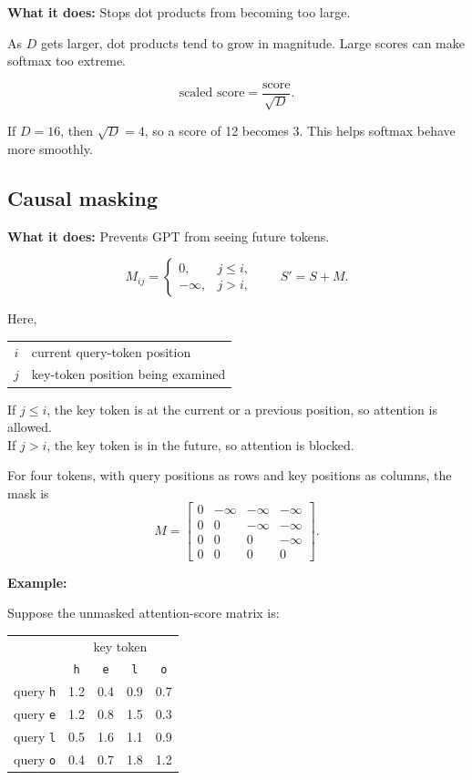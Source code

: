 \textbf{What it does:} Stops dot products from becoming too large.

As \(D\) gets larger, dot products tend to grow in magnitude. Large scores can
make softmax too extreme.

\[
  \text{scaled score}=\frac{\text{score}}{\sqrt{D}}.
\]

If \(D=16\), then \(\sqrt{D}=4\), so a score of 12 becomes 3. This helps
softmax behave more smoothly.

\subsection{Causal masking}

\textbf{What it does:} Prevents GPT from seeing future tokens.

\[
  M_{ij}=
  \begin{cases}
    0,       & j\leq i,\\
    -\infty, & j>i,
  \end{cases}
  \qquad
  S'=S+M.
\]

Here,
\begin{center}
\begin{tabular}{@{}cl@{}}
  \(i\) & current query-token position \\
  \(j\) & key-token position being examined
\end{tabular}
\end{center}

If \(j\leq i\), the key token is at the current or a previous position, so attention is allowed. \\
If \(j>i\), the key token is in the future, so attention
is blocked.

For four tokens, with query positions as rows and key positions as columns,
the mask is
\[
  M=
  \begin{bmatrix}
    0 & -\infty & -\infty & -\infty \\
    0 & 0       & -\infty & -\infty \\
    0 & 0       & 0       & -\infty \\
    0 & 0       & 0       & 0
  \end{bmatrix}.
\]

\textbf{Example:}

Suppose the unmasked attention-score matrix is:
\begin{center}
\begin{tabular}{@{}c cccc@{}}
  & \multicolumn{4}{c}{key token} \\
  & \texttt{h} & \texttt{e} & \texttt{l} & \texttt{o} \\
  query \texttt{h} & 1.2 & 0.4 & 0.9 & 0.7 \\
  query \texttt{e} & 1.2 & 0.8 & 1.5 & 0.3 \\
  query \texttt{l} & 0.5 & 1.6 & 1.1 & 0.9 \\
  query \texttt{o} & 0.4 & 0.7 & 1.8 & 1.2
\end{tabular}
\end{center}

